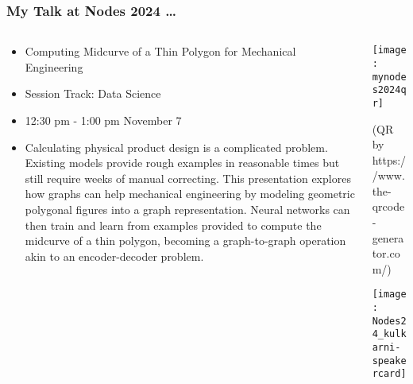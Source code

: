 \begin{frame}[fragile]\frametitle{My Talk at Nodes 2024 \ldots}
\begin{columns}
    \begin{column}[T]{0.6\linewidth}
		\begin{itemize}
		\item Computing Midcurve of a Thin Polygon for Mechanical Engineering
		\item Session Track: Data Science
		\item 12:30 pm - 1:00 pm November 7
		\item {\it 

Calculating physical product design is a complicated problem. Existing models provide rough examples in reasonable times but still require weeks of manual correcting. This presentation explores how graphs can help mechanical engineering by modeling geometric polygonal figures into a graph representation. Neural networks can then train and learn from examples provided to compute the midcurve of a thin polygon, becoming a graph-to-graph operation akin to an encoder-decoder problem.}
		\end{itemize}
    \end{column}
    \begin{column}[T]{0.4\linewidth}
		\begin{center}
		\texttt{[image: mynodes2024qr]}
		\end{center}	
		
		{\tiny (QR by https://www.the-qrcode-generator.com/)}
		
		\begin{center}
		\texttt{[image: Nodes24\_kulkarni-speakercard]}
		\end{center}			
    \end{column}
  \end{columns}
\end{frame}